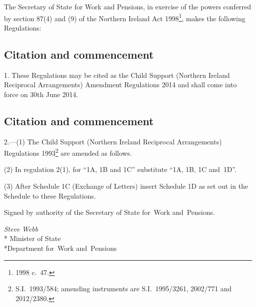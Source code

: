 \documentclass[12pt,a4paper]{article}
\title{\regstitle}
\author{S.I.\ 2014 No.\ 1423}
\date{Made
3rd June 2014\\
Laid before the House of Commons
9th June 2014\\
Coming into force
30th June 2014
}
\begin{document}
\maketitle

\enlargethispage{\baselineskip}

\noindent
The Secretary of State for Work and Pensions, in exercise of the powers conferred by section 87(4) and (9) of the Northern Ireland Act 1998\footnote{1998 c.~47.}, makes the following Regulations: 

{\sloppy

\tableofcontents

}

\bigskip

\setcounter{secnumdepth}{-2}

\subsection[1. Citation and commencement]{Citation and commencement}

1.  These Regulations may be cited as the Child Support (Northern Ireland Reciprocal Arrangements) Amendment Regulations 2014 and shall come into force on 30th June 2014.

\subsection[2. Amendment of the Northern Ireland Regulations]{Citation and commencement}

2.—(1) The Child Support (Northern Ireland Reciprocal Arrangements) Regulations 1993\footnote{S.I.~1993/584; amending instruments are S.I.~1995/3261, 2002/771 and 2012/2380.} are amended as follows.

(2) In regulation 2(1), for “1A, 1B and 1C” substitute “1A, 1B, 1C and~1D”.

(3) After Schedule 1C (Exchange of Letters) insert Schedule 1D as set out in the Schedule to these Regulations. 

\bigskip

\pagebreak[3]

Signed 
by authority of the 
Secretary of State for~Work and~Pensions.

{\raggedleft
\emph{Steve Webb}\\*
Minister
of State\\*Department 
for~Work and~Pensions

}
\end{document}
